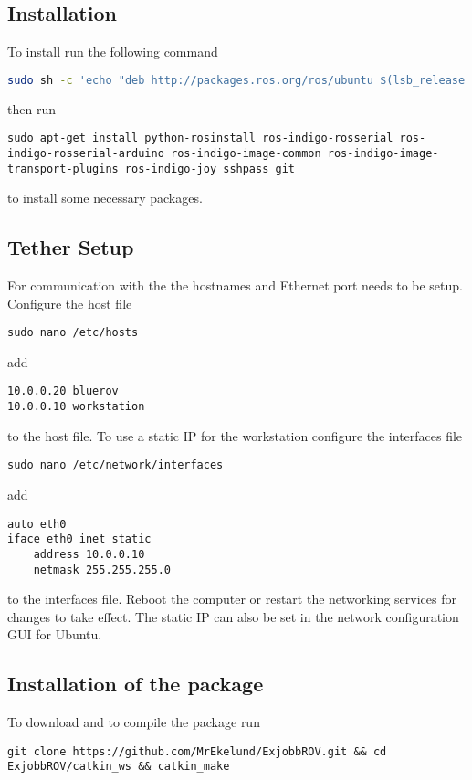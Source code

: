 \subsection{\abbrROS Installation}
To install \abbrROS run the following command
\begin{lstlisting}[language=bash]
sudo sh -c 'echo "deb http://packages.ros.org/ros/ubuntu $(lsb_release -sc) main" > /etc/apt/sources.list.d/ros-latest.list' && sudo apt-get install ros-indigo-ros-desktop-full && sudo rosdep init && rosdep update && echo "source /opt/ros/indigo/setup.bash" >> ~/.bashrc && source ~/.bashrc
\end{lstlisting}
then run 
\begin{lstlisting}
sudo apt-get install python-rosinstall ros-indigo-rosserial ros-indigo-rosserial-arduino ros-indigo-image-common ros-indigo-image-transport-plugins ros-indigo-joy sshpass git
\end{lstlisting}
to install some necessary packages.

\subsection{Tether Setup}
For communication with the \abbrROV the hostnames and Ethernet port needs to be setup.
Configure the host file 
\begin{lstlisting}
sudo nano /etc/hosts
\end{lstlisting}
add
\begin{lstlisting}
10.0.0.20 bluerov
10.0.0.10 workstation
\end{lstlisting}
to the host file. To use a static IP for the workstation configure the interfaces file
\begin{lstlisting}
sudo nano /etc/network/interfaces
\end{lstlisting}
add 
\begin{lstlisting}
auto eth0
iface eth0 inet static
    address 10.0.0.10
    netmask 255.255.255.0
\end{lstlisting}
to the interfaces file. Reboot the computer or restart the networking services for changes to take effect. The static IP can also be set in the network configuration GUI for Ubuntu.

\subsection{Installation of the \abbrROV package}
To download and to compile the package run
\begin{lstlisting}
git clone https://github.com/MrEkelund/ExjobbROV.git && cd ExjobbROV/catkin_ws && catkin_make
\end{lstlisting}